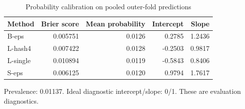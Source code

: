 \par
\begin{table}[H]
\centering
\begin{threeparttable}
\caption{Probability calibration on pooled outer-fold predictions}\label{tab:calibration}
\begin{tabular}{@{}lrrrr@{}}
\toprule
Method & Brier score & Mean probability & Intercept & Slope\\
\midrule
B-eps & 0.005751 & 0.0126 & 0.2785 & 1.2436\\
L-hash4 & 0.007422 & 0.0128 & -0.2503 & 0.9817\\
L-single & 0.010894 & 0.0119 & -0.5843 & 0.8406\\
S-eps & 0.006125 & 0.0120 & 0.9794 & 1.7617\\
\bottomrule
\end{tabular}
\begin{tablenotes}[flushleft]
\item[] Prevalence: 0.01137. Ideal diagnostic intercept/slope: 0/1. These are evaluation diagnostics.
\end{tablenotes}
\end{threeparttable}
\end{table}
\par
